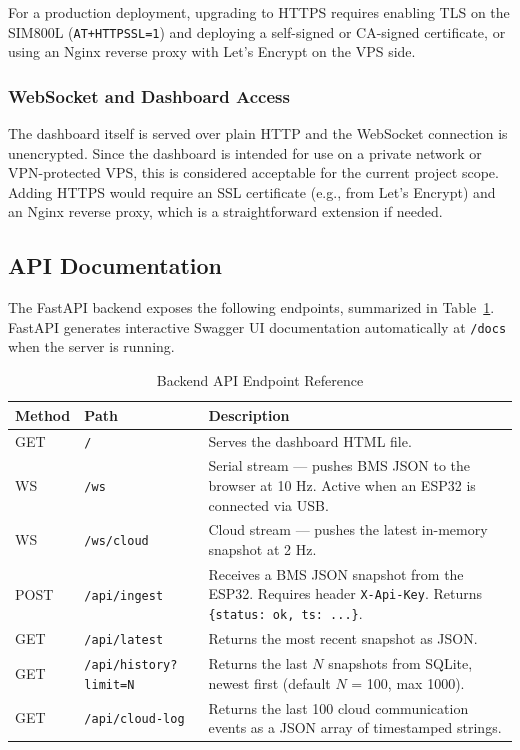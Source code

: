 For a production deployment, upgrading to HTTPS requires enabling TLS on the SIM800L (\texttt{AT+HTTPSSL=1}) and deploying a self-signed or CA-signed certificate, or using an Nginx reverse proxy with Let's Encrypt on the VPS side.

\subsubsection{WebSocket and Dashboard Access}

The dashboard itself is served over plain HTTP and the WebSocket connection is unencrypted. Since the dashboard is intended for use on a private network or VPN-protected VPS, this is considered acceptable for the current project scope. Adding HTTPS would require an SSL certificate (e.g., from Let's Encrypt) and an Nginx reverse proxy, which is a straightforward extension if needed.

\subsection{API Documentation}

The FastAPI backend exposes the following endpoints, summarized in Table~\ref{tab:api-endpoints}. FastAPI generates interactive Swagger UI documentation automatically at \texttt{/docs} when the server is running.

\begin{table}[h]
    \centering
    \caption{Backend API Endpoint Reference}
    \label{tab:api-endpoints}
    \begin{tabular}{llp{7.5cm}}
        \toprule
        \textbf{Method} & \textbf{Path} & \textbf{Description} \\
        \midrule
        GET  & \texttt{/}                        & Serves the dashboard HTML file. \\
        WS   & \texttt{/ws}                      & Serial stream — pushes BMS JSON to the browser at 10 Hz. Active when an ESP32 is connected via USB. \\
        WS   & \texttt{/ws/cloud}                & Cloud stream — pushes the latest in-memory snapshot at 2 Hz. \\
        POST & \texttt{/api/ingest}              & Receives a BMS JSON snapshot from the ESP32. Requires header \texttt{X-Api-Key}. Returns \texttt{\{status: ok, ts: ...\}}. \\
        GET  & \texttt{/api/latest}              & Returns the most recent snapshot as JSON. \\
        GET  & \texttt{/api/history?limit=N}     & Returns the last $N$ snapshots from SQLite, newest first (default $N$ = 100, max 1000). \\
        GET  & \texttt{/api/cloud-log}           & Returns the last 100 cloud communication events as a JSON array of timestamped strings. \\
        \bottomrule
    \end{tabular}
\end{table}

